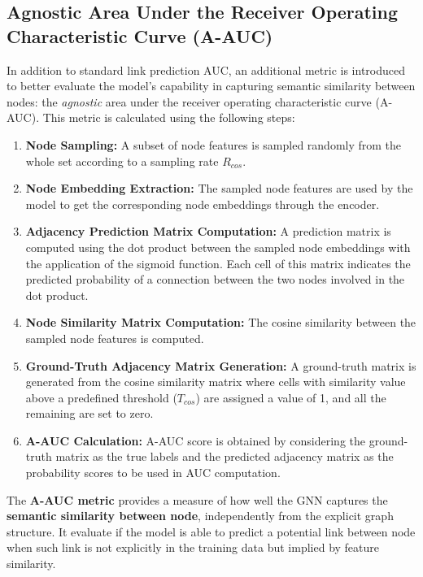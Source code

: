 \documentclass[11pt]{article}
\begin{document}
	\subsection{Agnostic Area Under the Receiver Operating Characteristic Curve (A-AUC)}
	\label{a_auc_section}
	In addition to standard link prediction AUC, an additional metric is introduced to better evaluate the model's capability in capturing semantic similarity between nodes: the \textit{agnostic} area under the receiver operating characteristic curve (A-AUC). This metric is calculated using the following steps:
	\begin{enumerate}
		\item \textbf{Node Sampling:} A subset of node features is sampled randomly from the whole set according to a sampling rate $R_{cos}$.
		
		\item \textbf{Node Embedding Extraction:} The sampled node features are used by the model to get the corresponding node embeddings through the encoder.
		
		\item \textbf{Adjacency Prediction Matrix Computation:}  A prediction matrix is computed using the dot product between the sampled node embeddings with the application of the sigmoid function. Each cell of this matrix indicates the predicted probability of a connection between the two nodes involved in the dot product.
		
		\item \textbf{Node Similarity Matrix Computation:} The cosine similarity between the sampled node features is computed.
		
		\item \textbf{Ground-Truth Adjacency Matrix Generation:} A ground-truth matrix is generated from the cosine similarity matrix where cells with similarity value above a predefined threshold ($T_{cos}$) are assigned a value of 1, and all the remaining are set to zero.
		
		\item \textbf{A-AUC Calculation:} A-AUC score is obtained by considering the ground-truth matrix as the true labels and the predicted adjacency matrix as the probability scores to be used in AUC computation.
	\end{enumerate}
	The \textbf{A-AUC metric} provides a measure of how well the GNN captures the \textbf{semantic similarity between node}, independently from the explicit graph structure. It evaluate if the model is able to predict a potential link between node when such link is not explicitly in the training data but implied by feature similarity.
	
\end{document}
